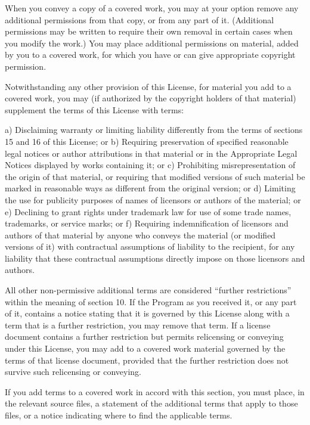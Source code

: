 When you convey a copy of a covered work, you may at your option remove any additional permissions from that copy, or from any part of it. (Additional permissions may be written to require their own removal in certain cases when you modify the work.) You may place additional permissions on material, added by you to a covered work, for which you have or can give appropriate copyright permission.

Notwithstanding any other provision of this License, for material you add to a covered work, you may (if authorized by the copyright holders of that material) supplement the terms of this License with terms:

    a) Disclaiming warranty or limiting liability differently from the terms of sections 15 and 16 of this License; or
    b) Requiring preservation of specified reasonable legal notices or author attributions in that material or in the Appropriate Legal Notices displayed by works containing it; or
    c) Prohibiting misrepresentation of the origin of that material, or requiring that modified versions of such material be marked in reasonable ways as different from the original version; or
    d) Limiting the use for publicity purposes of names of licensors or authors of the material; or
    e) Declining to grant rights under trademark law for use of some trade names, trademarks, or service marks; or
    f) Requiring indemnification of licensors and authors of that material by anyone who conveys the material (or modified versions of it) with contractual assumptions of liability to the recipient, for any liability that these contractual assumptions directly impose on those licensors and authors.

All other non-permissive additional terms are considered “further restrictions” within the meaning of section 10. If the Program as you received it, or any part of it, contains a notice stating that it is governed by this License along with a term that is a further restriction, you may remove that term. If a license document contains a further restriction but permits relicensing or conveying under this License, you may add to a covered work material governed by the terms of that license document, provided that the further restriction does not survive such relicensing or conveying.

If you add terms to a covered work in accord with this section, you must place, in the relevant source files, a statement of the additional terms that apply to those files, or a notice indicating where to find the applicable terms.

